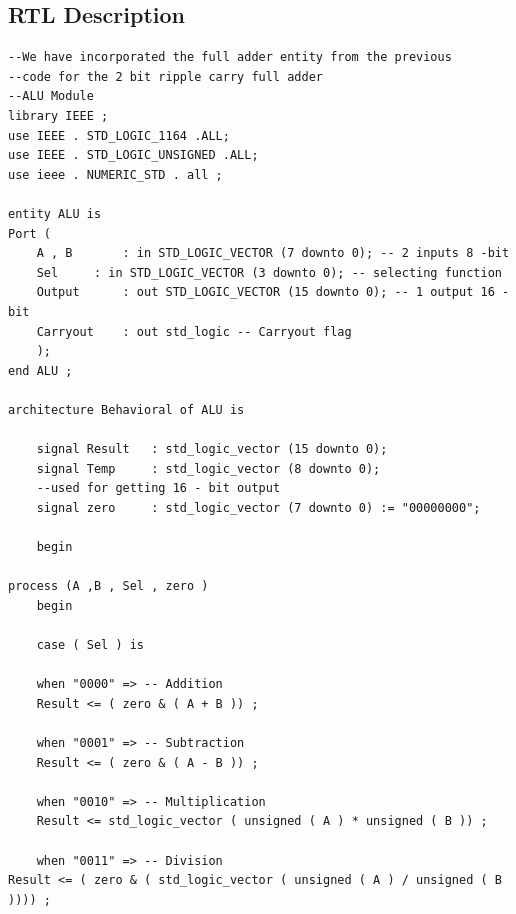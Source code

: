 \documentclass[12pt,singleside,a4paper]{article}
\begin{document}
\subsection{RTL Description}
\begin{lstlisting}[style=VHDL, frame=single,linewidth = 18cm]
--We have incorporated the full adder entity from the previous
--code for the 2 bit ripple carry full adder
--ALU Module
library IEEE ;
use IEEE . STD_LOGIC_1164 .ALL;
use IEEE . STD_LOGIC_UNSIGNED .ALL;
use ieee . NUMERIC_STD . all ;

entity ALU is
Port (
	A , B 	    : in STD_LOGIC_VECTOR (7 downto 0); -- 2 inputs 8 -bit
	Sel 	: in STD_LOGIC_VECTOR (3 downto 0); -- selecting function
	Output 	    : out STD_LOGIC_VECTOR (15 downto 0); -- 1 output 16 - bit
	Carryout    : out std_logic -- Carryout flag
	);
end ALU ;

architecture Behavioral of ALU is

	signal Result   : std_logic_vector (15 downto 0);
	signal Temp     : std_logic_vector (8 downto 0);
	--used for getting 16 - bit output
	signal zero     : std_logic_vector (7 downto 0) := "00000000";

	begin

process (A ,B , Sel , zero )
	begin

	case ( Sel ) is

	when "0000" => -- Addition
	Result <= ( zero & ( A + B )) ;

	when "0001" => -- Subtraction
	Result <= ( zero & ( A - B )) ;

	when "0010" => -- Multiplication
	Result <= std_logic_vector ( unsigned ( A ) * unsigned ( B )) ;

	when "0011" => -- Division
Result <= ( zero & ( std_logic_vector ( unsigned ( A ) / unsigned ( B )))) ;
	  \end{lstlisting}
	  \newpage
\end{document}
